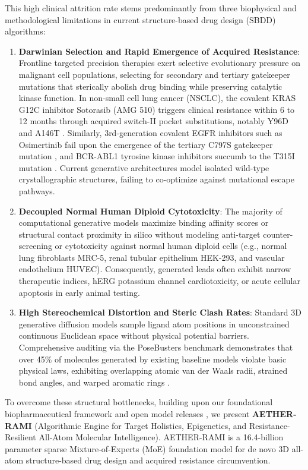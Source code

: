 \documentclass[10pt,journal,compsoc]{IEEEtran}
\begin{document}
This high clinical attrition rate stems predominantly from three biophysical and methodological limitations in current structure-based drug design (SBDD) algorithms:
\begin{enumerate}
    \item \textbf{Darwinian Selection and Rapid Emergence of Acquired Resistance}: Frontline targeted precision therapies exert selective evolutionary pressure on malignant cell populations, selecting for secondary and tertiary gatekeeper mutations that sterically abolish drug binding while preserving catalytic kinase function. In non-small cell lung cancer (NSCLC), the covalent KRAS G12C inhibitor Sotorasib (AMG 510) \cite{canon2019clinical} triggers clinical resistance within 6 to 12 months through acquired switch-II pocket substitutions, notably Y96D and A146T \cite{tanaka2021clinical}. Similarly, 3rd-generation covalent EGFR inhibitors such as Osimertinib fail upon the emergence of the tertiary C797S gatekeeper mutation \cite{thress2015acquired}, and BCR-ABL1 tyrosine kinase inhibitors succumb to the T315I mutation \cite{shah2004overriding}. Current generative architectures model isolated wild-type crystallographic structures, failing to co-optimize against mutational escape pathways.
    \item \textbf{Decoupled Normal Human Diploid Cytotoxicity}: The majority of computational generative models maximize binding affinity scores or structural contact proximity in silico without modeling anti-target counter-screening or cytotoxicity against normal human diploid cells (e.g., normal lung fibroblasts MRC-5, renal tubular epithelium HEK-293, and vascular endothelium HUVEC). Consequently, generated leads often exhibit narrow therapeutic indices, hERG potassium channel cardiotoxicity, or acute cellular apoptosis in early animal testing.
    \item \textbf{High Stereochemical Distortion and Steric Clash Rates}: Standard 3D generative diffusion models sample ligand atom positions in unconstrained continuous Euclidean space without physical potential barriers. Comprehensive auditing via the PoseBusters benchmark demonstrates that over 45\% of molecules generated by existing baseline models violate basic physical laws, exhibiting overlapping atomic van der Waals radii, strained bond angles, and warped aromatic rings \cite{van2023posebusters}.
\end{enumerate}

To overcome these structural bottlenecks, building upon our foundational biopharmaceutical framework \cite{yadav2026aether} and open model releases \cite{yadav2026model,yadav2026space,yadav2026code}, we present \textbf{AETHER-RAMI} (Algorithmic Engine for Target Holistics, Epigenetics, and Resistance-Resilient All-Atom Molecular Intelligence). AETHER-RAMI is a 16.4-billion parameter sparse Mixture-of-Experts (MoE) foundation model for de novo 3D all-atom structure-based drug design and acquired resistance circumvention.
\end{document}
